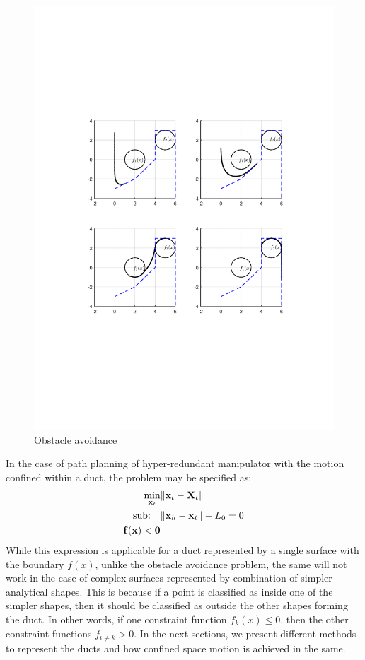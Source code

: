 \documentclass[11pt,a4paper]{article}
\begin{document}
\begin{figure}[h]
\centering
\includegraphics[scale=0.75]{figures/fig3.pdf}
\caption{Obstacle avoidance\label{fig3}}
\end{figure}

In the case of path planning of hyper-redundant manipulator with the motion confined within a duct, the problem may be specified as:
\begin{align}
\min_{\textbf{x}_t} &\Vert \textbf{x}_t-\textbf{X}_t \Vert\\
\text{sub:~~~} &\Vert \textbf{x}_h - \textbf{x}_t \Vert -L_0 = 0\\
 \bf{f}(x) <0
\end{align}
While this expression is applicable for a duct represented by a single surface with the boundary $f(x)$, unlike the obstacle avoidance problem, the same will not work in the case of complex surfaces represented by combination of simpler analytical shapes. This is because if a point is classified as inside one of the simpler shapes, then it should be classified as outside the other shapes forming the duct. In other words, if one constraint function $f_k(x)\le 0$, then the other constraint functions $f_{i\neq k}>0$. In the next sections, we present different methods to represent the ducts and how confined space motion is achieved in the same.
\end{document}
